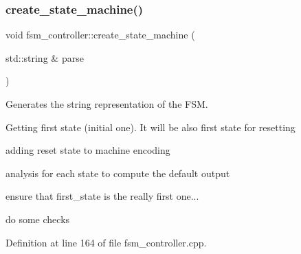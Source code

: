 \subsubsection{\texorpdfstring{create\+\_\+state\+\_\+machine()}{create\_state\_machine()}}
{\footnotesize\ttfamily void fsm\+\_\+controller\+::create\+\_\+state\+\_\+machine (\begin{DoxyParamCaption}\item[{std\+::string \&}]{parse }\end{DoxyParamCaption})\hspace{0.3cm}{\ttfamily [private]}}



Generates the string representation of the F\+SM. 

Getting first state (initial one). It will be also first state for resetting

adding reset state to machine encoding

analysis for each state to compute the default output

ensure that first\+\_\+state is the really first one...

do some checks 

Definition at line 164 of file fsm\+\_\+controller.\+cpp.



